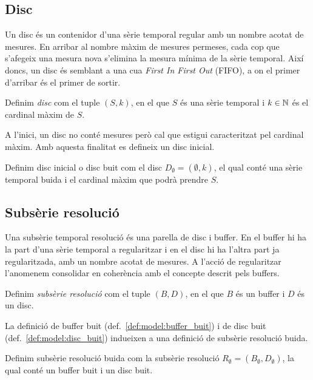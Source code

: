 \subsection{Disc}\label{sec:model:disc}

Un disc és un contenidor d'una sèrie temporal regular amb un nombre
acotat de mesures. En arribar al nombre màxim de mesures permeses,
cada cop que s'afegeix una mesura nova s'elimina la mesura mínima de
la sèrie temporal.  Així doncs, un disc és semblant a una cua
\emph{First In First Out} (FIFO), a on el primer d'arribar és el
primer de sortir.

\begin{definition}[Disc]
  Definim \emph{disc} com el tuple $(S,k)$, en el que $S$
  és una sèrie temporal i $k\in\mathbb{N}{}$ és el cardinal màxim de $S$.
\end{definition}

A l'inici, un disc no conté mesures però cal que estigui caracteritzat
pel cardinal màxim. Amb aquesta finalitat es defineix un disc inicial.

\begin{definition}\label{def:model:disc_buit}
  Definim disc inicial o disc buit com el disc $D_{\emptyset} =
  (\emptyset,k)$, el qual conté una sèrie temporal buida i el cardinal
  màxim que podrà prendre $S$.
\end{definition}




\subsection{Subsèrie resolució}\label{sec:model:subserie-resolucio}

Una subsèrie temporal resolució és una parella de disc i buffer. En el
buffer hi ha la part d'una sèrie temporal a regularitzar i en el disc
hi ha l'altra part ja regularitzada, amb un nombre acotat de
mesures. A l'acció de regularitzar l'anomenem consolidar en coherència
amb el concepte descrit pels buffers.


\begin{definition}
  Definim \emph{subsèrie resolució} com el tuple $(B,D)$, en el que
  $B$ és un buffer i $D$ és un disc.
\end{definition}
 
La definició de buffer buit (def.~\ref{def:model:buffer_buit}) i de
disc buit (def.~\ref{def:model:disc_buit}) indueixen a una definició
de subsèrie resolució buida.
\begin{definition}\label{def:model:subserie_resolucio_buida}
  Definim subsèrie resolució buida com la subsèrie resolució $R_{\emptyset}
  = (B_{\emptyset},D_{\emptyset})$, la qual conté un buffer buit i un
  disc buit.
\end{definition}


